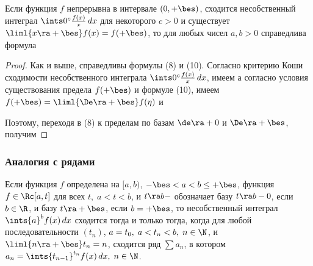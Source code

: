 \documentclass[a4paper]{article}
\begin{document}
\begin{theorem}
Если функция $f$ непрерывна в интервале $(0,+\bes)$, сходится
несобственный интеграл $\ints0^c \frac{f(x)}x\,dx$ для некоторого
$c>0$ и существует $\liml{x\ra+\bes}f(x) = f(+\bes)$, то для любых
чисел $a,b>0$ справедлива формула 
\end{theorem}

\begin{proof}
Как и выше, справедливы формулы (8) и (10). Согласно критерию Коши
сходимости несобственного интеграла $\ints0^c \frac{f(x)}x\,dx$,
имеем  а
согласно условия существования предела $f(+\bes)$ и формуле (10),
имеем $f(+\bes)=\liml{\De\ra+\bes} f(\eta)$ и

Поэтому, переходя в (8) к пределам по базам $\de\ra+0$ и
$\De\ra+\bes$, получим 
\end{proof}

\subsubsection{Аналогия с рядами}

\begin{theorem}
  Если функция $f$ определена на $[a,b)$, $-\bes<a<b\le+\bes$,
  функция $f\in\Rc[a,t]$ для всех $t, \; a<t<b$, и $t\ra b-$
  обозначает базу $t\ra b-0$, если $b\in\R$, и базу $t\ra+\bes$,
  если $b=+\bes$, то несобственный интеграл $\ints{a}^b f(x)\,dx$
  сходится тогда и только тогда, когда для любой последовательности
  $(t_n)$, $a=t_0, \; a<t_n<b, \; n\in\N$, и $\liml{n\ra+\bes}
  t_n=n$, сходится ряд $\sum a_n$, в котором $a_n =
  \ints{t_{n-1}}^{t_n} f(x)\,dx, \; n\in\N$.
\end{theorem}
\end{document}
